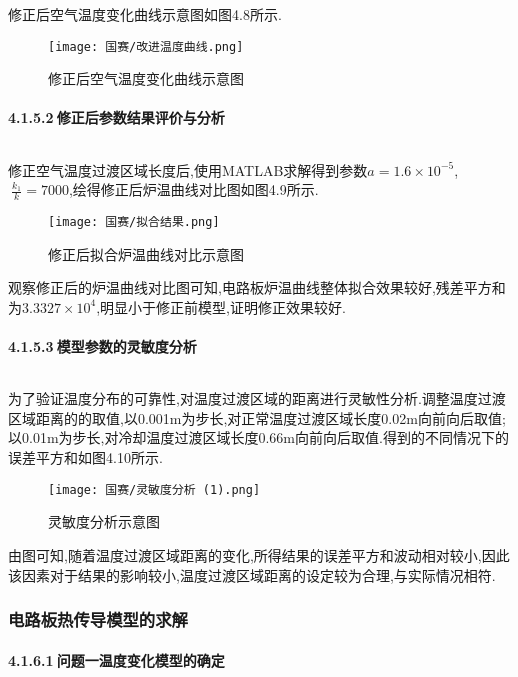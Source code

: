 \documentclass[12pt]{ctexart}
\numberwithin{figure}{section}
\numberwithin{table}{section}
\begin{document}
修正后空气温度变化曲线示意图如图4.8所示.
\begin{figure}[!htp]
    \centering
    \setlength{\belowcaptionskip}{0pt}
    \texttt{[image: 国赛/改进温度曲线.png]}
    \caption{修正后空气温度变化曲线示意图}
    \label{tab:图1}
\end{figure}

\paragraph{4.1.5.2$\ $修正后参数结果评价与分析}$\ $

修正空气温度过渡区域长度后,使用MATLAB求解得到参数$a=1.6\times10^{-5}$,$\ \frac{k_1}{k}=7000$,绘得修正后炉温曲线对比图如图4.9所示.

\begin{figure}[!htp]
    \centering
    \setlength{\belowcaptionskip}{0pt}
    \texttt{[image: 国赛/拟合结果.png]}
    \caption{修正后拟合炉温曲线对比示意图}
    \label{tab:图1}
\end{figure}

观察修正后的炉温曲线对比图可知,电路板炉温曲线整体拟合效果较好,残差平方和为$3.3327\times10^4$,明显小于修正前模型,证明修正效果较好.
\paragraph{4.1.5.3$\ $模型参数的灵敏度分析}$\ $

为了验证温度分布的可靠性,对温度过渡区域的距离进行灵敏性分析.调整温度过渡区域距离的的取值,以0.001m为步长,对正常温度过渡区域长度0.02m向前向后取值;以0.01m为步长,对冷却温度过渡区域长度0.66m向前向后取值.得到的不同情况下的误差平方和如图4.10所示.

\begin{figure}[!htp]
    \centering
    \setlength{\belowcaptionskip}{0pt}
    \texttt{[image: 国赛/灵敏度分析 (1).png]}
    \caption{灵敏度分析示意图}
    \label{tab:图1}
\end{figure}

由图可知,随着温度过渡区域距离的变化,所得结果的误差平方和波动相对较小,因此该因素对于结果的影响较小,温度过渡区域距离的设定较为合理,与实际情况相符.
\newpage
\subsubsection{电路板热传导模型的求解}
\paragraph{4.1.6.1$\ $问题一温度变化模型的确定}$\ $
\end{document}

